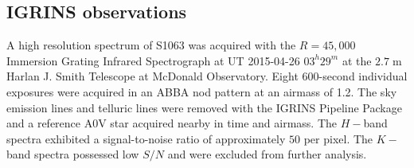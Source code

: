 \documentclass[trackchanges]{aastex631}
\begin{document}
\subsection{IGRINS observations}
A high resolution spectrum of S1063 was acquired with the $R=45,000$ Immersion Grating Infrared Spectrograph \citep[IGRINS;][]{park14} at UT 2015-04-26 $03^h29^m$ at the $2.7\;$m Harlan J. Smith Telescope at McDonald Observatory.  Eight 600-second individual exposures were acquired in an ABBA nod pattern at an airmass of 1.2.  The sky emission lines and telluric lines were removed with the IGRINS Pipeline Package  \citep[PLP;][]{jaejoonlee16} and a reference A0V star acquired nearby in time and airmass.
The $H-$band spectra exhibited a signal-to-noise ratio of approximately $50$ per pixel.
The $K-$band spectra possessed low $S/N$ and were excluded from further analysis.
\end{document}
